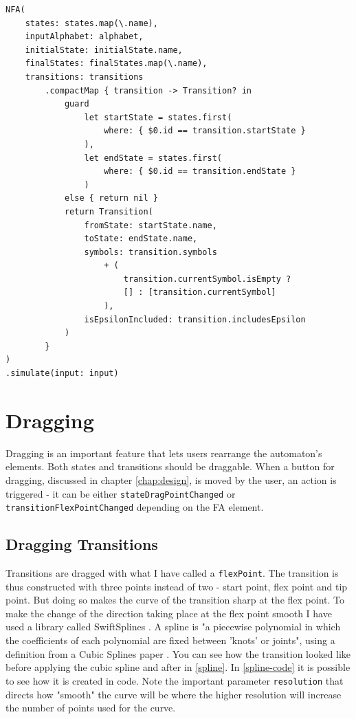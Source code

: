 \begin{lstlisting}[caption={\lstinline{NFA} initialization in \lstinline{AutomataLibrarryService}}, label=nfa-init]
NFA(
    states: states.map(\.name),
    inputAlphabet: alphabet,
    initialState: initialState.name,
    finalStates: finalStates.map(\.name),
    transitions: transitions
        .compactMap { transition -> Transition? in
            guard
                let startState = states.first(
                    where: { $0.id == transition.startState }
                ),
                let endState = states.first(
                    where: { $0.id == transition.endState }
                )
            else { return nil }
            return Transition(
                fromState: startState.name,
                toState: endState.name,
                symbols: transition.symbols
                    + (
                        transition.currentSymbol.isEmpty ? 
                        [] : [transition.currentSymbol]
                    ),
                isEpsilonIncluded: transition.includesEpsilon
            )
        }
)
.simulate(input: input)
\end{lstlisting}

\section{Dragging}

Dragging is an important feature that lets users rearrange the automaton's elements. Both states and transitions should be draggable. When a button for dragging, discussed in chapter \ref{chap:design}, is moved by the user, an action is triggered - it can be either \lstinline{stateDragPointChanged} or \lstinline{transitionFlexPointChanged} depending on the FA element.

\subsection{Dragging Transitions}

Transitions are dragged with what I have called a \lstinline{flexPoint}. The transition is thus constructed with three points instead of two - start point, flex point and tip point. But doing so makes the curve of the transition sharp at the flex point. To make the change of the direction taking place at the flex point smooth I have used a library called SwiftSplines \cite{swiftsplines}. A spline is "a piecewise polynomial in which the coefficients of each polynomial are fixed between 'knots' or joints", using a definition from a Cubic Splines paper \cite{cubic-splines}. You can see how the transition looked like before applying the cubic spline and after in \ref{spline}. In \ref{spline-code} it is possible to see how it is created in code. Note the important parameter \lstinline{resolution} that directs how "smooth" the curve will be where the higher resolution will increase the number of points used for the curve.

